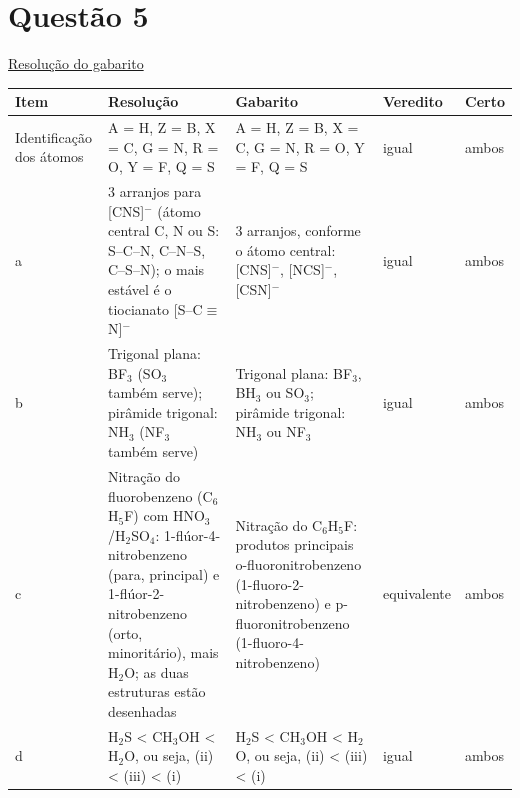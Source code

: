 \documentclass{article}%
\begin{document}
\section*{Questão 5}%
\href{https://poliedroresolve.sistemapoliedro.com.br/vestibulares/ita/2026/ita-2-fase-dia-2-29-10-2025-2-fase-dia-2/dissertativa-5-quimica-2-fase-dia-2-ita-2026}{Resolução do gabarito}\par\smallskip%
\begin{longtable}{@{}p{} p{} p{} p{} p{}@{}}\toprule Item & Resolução & Gabarito & Veredito & Certo \\ \midrule
Identificação dos átomos & A = H, Z = B, X = C, G = N, R = O, Y = F, Q = S & A = H, Z = B, X = C, G = N, R = O, Y = F, Q = S & igual & ambos \\
a & 3 arranjos para {[}CNS{]}$^{-}$ (átomo central C, N ou S: S--C--N, C--N--S, C--S--N); o mais estável é o tiocianato {[}S--C$\equiv$N{]}$^{-}$ & 3 arranjos, conforme o átomo central: {[}CNS{]}$^{-}$, {[}NCS{]}$^{-}$, {[}CSN{]}$^{-}$ & igual & ambos \\
b & Trigonal plana: BF$_{3}$ (SO$_{3}$ também serve); pirâmide trigonal: NH$_{3}$ (NF$_{3}$ também serve) & Trigonal plana: BF$_{3}$, BH$_{3}$ ou SO$_{3}$; pirâmide trigonal: NH$_{3}$ ou NF$_{3}$ & igual & ambos \\
c & Nitração do fluorobenzeno (C$_{6}$H$_{5}$F) com HNO$_{3}$/H$_{2}$SO$_{4}$: 1{-}flúor{-}4{-}nitrobenzeno (para, principal) e 1{-}flúor{-}2{-}nitrobenzeno (orto, minoritário), mais H$_{2}$O; as duas estruturas estão desenhadas & Nitração do C$_{6}$H$_{5}$F: produtos principais o{-}fluoronitrobenzeno (1{-}fluoro{-}2{-}nitrobenzeno) e p{-}fluoronitrobenzeno (1{-}fluoro{-}4{-}nitrobenzeno) & equivalente & ambos \\
d & H$_{2}$S < CH$_{3}$OH < H$_{2}$O, ou seja, (ii) < (iii) < (i) & H$_{2}$S < CH$_{3}$OH < H$_{2}$O, ou seja, (ii) < (iii) < (i) & igual & ambos \\
\bottomrule\end{longtable}%
\end{document}
